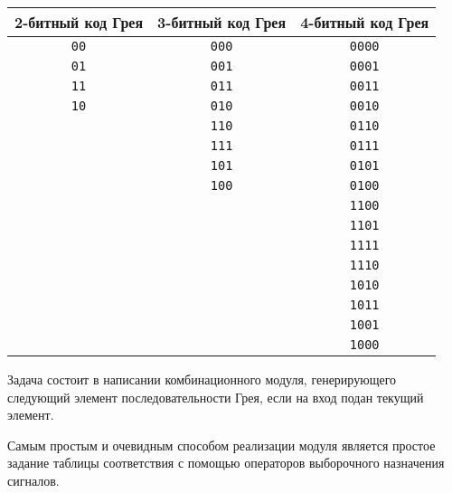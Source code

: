 \begin{table}[h]
\centering
\begin{tabular}{|c|c|c|}
\hline
2-битный код Грея & 3-битный код Грея & 4-битный код Грея \\ \hline
\texttt{00}       & \texttt{000}      & \texttt{0000}     \\
\texttt{01}       & \texttt{001}      & \texttt{0001}     \\
\texttt{11}       & \texttt{011}      & \texttt{0011}     \\
\texttt{10}       & \texttt{010}      & \texttt{0010}     \\
                  & \texttt{110}      & \texttt{0110}     \\
                  & \texttt{111}      & \texttt{0111}     \\
                  & \texttt{101}      & \texttt{0101}     \\
                  & \texttt{100}      & \texttt{0100}     \\
                  &                   & \texttt{1100}     \\
                  &                   & \texttt{1101}     \\
                  &                   & \texttt{1111}     \\
                  &                   & \texttt{1110}     \\
                  &                   & \texttt{1010}     \\
                  &                   & \texttt{1011}     \\
                  &                   & \texttt{1001}     \\
                  &                   & \texttt{1000}     \\
\hline
\end{tabular}
\end{table}

Задача состоит в написании комбинационного модуля, генерирующего следующий элемент последовательности Грея, если на вход подан текущий элемент.

Самым простым и очевидным способом реализации модуля является простое задание таблицы соответствия с помощью операторов выборочного назначения сигналов.

